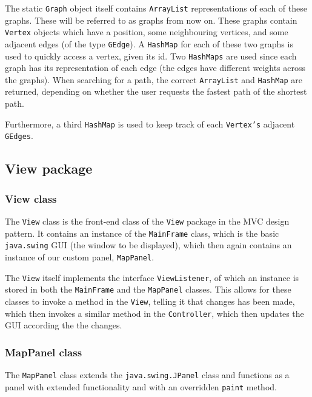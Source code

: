 \documentclass[a4paper,11pt]{article}
\begin{document}
The static \texttt{Graph} object itself contains \texttt{ArrayList} representations of each of these graphs. These will be referred to as graphs from now on. These graphs contain \texttt{Vertex} objects which have a position, some neighbouring vertices, and some adjacent edges (of the type \texttt{GEdge}). A \texttt{HashMap} for each of these two graphs is used to quickly access a vertex, given its id. Two \texttt{HashMaps} are used since each graph has its representation of each edge (the edges have different weights across the graphs). When searching for a path, the correct \texttt{ArrayList} and \texttt{HashMap} are returned, depending on whether the user requests the fastest path of the shortest path.

Furthermore, a third \texttt{HashMap} is used to keep track of each \texttt{Vertex's} adjacent \texttt{GEdges}.

\subsection{View package} %

\subsubsection{View class} %
The \texttt{View} class is the front-end class of the \texttt{View} package in the MVC design pattern. It contains an instance of the \texttt{MainFrame} class, which is the basic \texttt{java.swing} GUI (the window to be displayed), which then again contains an instance of our custom panel, \texttt{MapPanel}.

The \texttt{View} itself implements the interface \texttt{ViewListener}, of which an instance is stored in both the \texttt{MainFrame} and the \texttt{MapPanel} classes. This allows for these classes to invoke a method in the \texttt{View}, telling it that changes has been made, which then invokes a similar method in the \texttt{Controller}, which then updates the GUI according the the changes.

\subsubsection{MapPanel class} %
The \texttt{MapPanel} class extends the \texttt{java.swing.JPanel} class and functions as a panel with extended functionality and with an overridden \texttt{paint} method.
\end{document}

